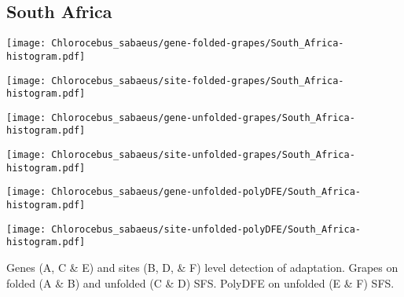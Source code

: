 \documentclass{article}
\begin{document}
\subsection{South Africa}
\centering
\begin{minipage}{0.49\linewidth}
    \texttt{[image: Chlorocebus\_sabaeus/gene-folded-grapes/South\_Africa-histogram.pdf]}
\end{minipage}%
\hfill
\begin{minipage}{0.49\linewidth}
    \texttt{[image: Chlorocebus\_sabaeus/site-folded-grapes/South\_Africa-histogram.pdf]}
\end{minipage}
\hfill
\begin{minipage}{0.49\linewidth}
    \texttt{[image: Chlorocebus\_sabaeus/gene-unfolded-grapes/South\_Africa-histogram.pdf]}
\end{minipage}%
\hfill
\begin{minipage}{0.49\linewidth}
    \texttt{[image: Chlorocebus\_sabaeus/site-unfolded-grapes/South\_Africa-histogram.pdf]}
\end{minipage}
\hfill
\begin{minipage}{0.49\linewidth}
    \texttt{[image: Chlorocebus\_sabaeus/gene-unfolded-polyDFE/South\_Africa-histogram.pdf]}
\end{minipage}%
\hfill
\begin{minipage}{0.49\linewidth}
    \texttt{[image: Chlorocebus\_sabaeus/site-unfolded-polyDFE/South\_Africa-histogram.pdf]}
\end{minipage}
\hfill
\flushleft
Genes (A, C \& E) and sites (B, D, \& F) level detection of adaptation.
Grapes on folded (A \& B) and unfolded (C \& D) SFS.
PolyDFE on unfolded (E \& F) SFS.

\pagebreak
\end{document}
